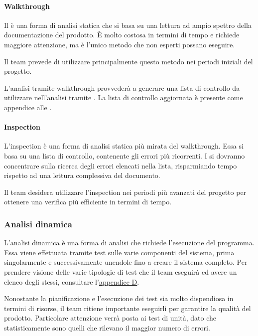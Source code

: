 				\paragraph{Walkthrough}
					Il  è una forma di analisi statica che si basa su una lettura ad ampio spettro della documentazione del prodotto. È molto costosa in termini di tempo e richiede maggiore attenzione, ma è l'unico metodo che \verificatori{} non esperti possano eseguire.
				
					
					 Il team prevede di utilizzare principalmente questo metodo nei periodi iniziali del progetto. 
					
					
					L'analisi tramite walkthrough provvederà a generare una lista di controllo da utilizzare nell'analisi tramite . La lista di controllo aggiornata è presente come appendice alle \ndpv.
					
				\paragraph{Inspection}
					L'inspection è una forma di analisi statica più mirata del walkthrough. Essa si basa su una lista di controllo, contenente gli errori più ricorrenti. I \verificatori{} si dovranno concentrare sulla ricerca degli errori elencati nella lista, risparmiando tempo rispetto ad una lettura complessiva del documento. 
					
					
					Il team desidera utilizzare l'inspection nei periodi più avanzati del progetto per ottenere una verifica più efficiente in termini di tempo. 
					
			\subsubsection{Analisi dinamica}
					L'analisi dinamica è una forma di analisi che richiede l'esecuzione del programma. Essa viene effettuata tramite test sulle varie componenti del sistema, prima singolarmente e successivamente unendole fino a creare il sistema completo. Per prendere visione delle varie tipologie di test che il team eseguirà ed avere un elenco degli stessi, consultare l'\hyperref[Test]{appendice D}.
					
					Nonostante la pianificazione e l'esecuzione dei test sia molto dispendiosa in termini di risorse, il team ritiene importante eseguirli per garantire la qualità del prodotto. Particolare attenzione verrà posta ai test di unità, dato che statisticamente sono quelli che rilevano il maggior numero di errori.
